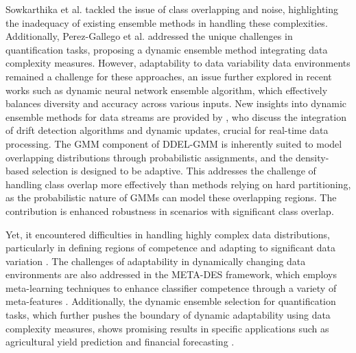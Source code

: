 \documentclass[lettersize,journal]{IEEEtran}
\newcommand{\greenhighlight}[1]{\textcolor{highlightgreen}{#1}}
\begin{document}
Sowkarthika et al. \cite{b_data_2023} tackled the issue of class overlapping and noise, highlighting the inadequacy of existing ensemble methods in handling these complexities. Additionally, Perez-Gallego et al. \cite{perez-gallego_dynamic_2019} addressed the unique challenges in quantification tasks, proposing a dynamic ensemble method integrating data complexity measures. However, adaptability to data variability data environments remained a challenge for these approaches, an issue further explored in recent works such as \cite{alam_dynamic_2020} dynamic neural network ensemble algorithm, which effectively balances diversity and accuracy across various inputs. New insights into dynamic ensemble methods for data streams are provided by \cite{gomes_survey_2017}, who discuss the integration of drift detection algorithms and dynamic updates, crucial for real-time data processing. \greenhighlight{The GMM component of DDEL-GMM is inherently suited to model overlapping distributions through probabilistic assignments, and the density-based selection is designed to be adaptive. This addresses the challenge of handling class overlap more effectively than methods relying on hard partitioning, as the probabilistic nature of GMMs can model these overlapping regions. The contribution is enhanced robustness in scenarios with significant class overlap.}

Yet, it encountered difficulties in handling highly complex data distributions, particularly in defining regions of competence and adapting to significant data variation \cite{sierra_k_2011}. The challenges of adaptability in dynamically changing data environments are also addressed in the META-DES framework, which employs meta-learning techniques to enhance classifier competence through a variety of meta-features \cite{gomes_survey_2017}. Additionally, the dynamic ensemble selection for quantification tasks, which further pushes the boundary of dynamic adaptability using data complexity measures, shows promising results in specific applications such as agricultural yield prediction and financial forecasting \cite{perez-gallego_dynamic_2019, swaminathan_meta_2022}. 
\end{document}
